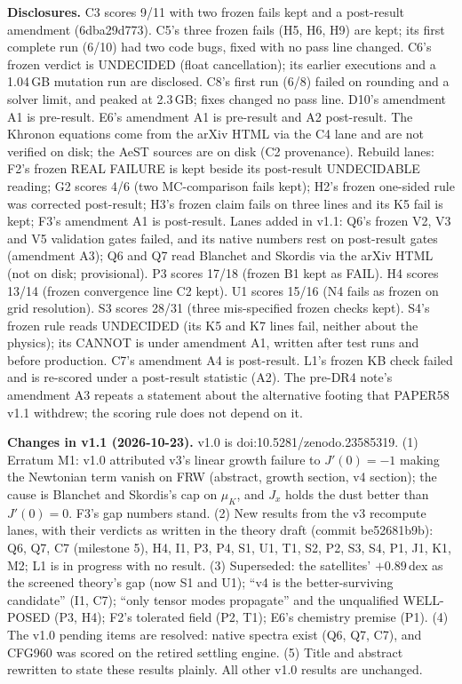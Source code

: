 \documentclass[10pt]{article}
\begin{document}
\textbf{Disclosures.} C3 scores 9/11 with two frozen fails kept and a post-result amendment (6dba29d773). C5's three frozen fails (H5, H6, H9) are kept; its first complete run (6/10) had two code bugs, fixed with no pass line changed. C6's frozen verdict is UNDECIDED (float cancellation); its earlier executions and a 1.04\,GB mutation run are disclosed. C8's first run (6/8) failed on rounding and a solver limit, and peaked at 2.3\,GB; fixes changed no pass line. D10's amendment A1 is pre-result. E6's amendment A1 is pre-result and A2 post-result. The Khronon equations come from the arXiv HTML via the C4 lane and are not verified on disk; the AeST sources are on disk (C2 provenance). Rebuild lanes: F2's frozen REAL FAILURE is kept beside its post-result UNDECIDABLE reading; G2 scores 4/6 (two MC-comparison fails kept); H2's frozen one-sided rule was corrected post-result; H3's frozen claim fails on three lines and its K5 fail is kept; F3's amendment A1 is post-result. Lanes added in v1.1: Q6's frozen V2, V3 and V5 validation gates failed, and its native numbers rest on post-result gates (amendment A3); Q6 and Q7 read Blanchet and Skordis via the arXiv HTML (not on disk; provisional). P3 scores 17/18 (frozen B1 kept as FAIL). H4 scores 13/14 (frozen convergence line C2 kept). U1 scores 15/16 (N4 fails as frozen on grid resolution). S3 scores 28/31 (three mis-specified frozen checks kept). S4's frozen rule reads UNDECIDED (its K5 and K7 lines fail, neither about the physics); its CANNOT is under amendment A1, written after test runs and before production. C7's amendment A4 is post-result. L1's frozen KB check failed and is re-scored under a post-result statistic (A2). The pre-DR4 note's amendment A3 repeats a statement about the alternative footing that PAPER58 v1.1 withdrew; the scoring rule does not depend on it.

\textbf{Changes in v1.1 (2026-10-23).} v1.0 is doi:10.5281/zenodo.23585319. (1) Erratum M1: v1.0 attributed v3's linear growth failure to $J'(0)=-1$ making the Newtonian term vanish on FRW (abstract, growth section, v4 section); the cause is Blanchet and Skordis's cap on $\mu_K$, and $J_x$ holds the dust better than $J'(0)=0$. F3's gap numbers stand. (2) New results from the v3 recompute lanes, with their verdicts as written in the theory draft (commit be52681b9b): Q6, Q7, C7 (milestone 5), H4, I1, P3, P4, S1, U1, T1, S2, P2, S3, S4, P1, J1, K1, M2; L1 is in progress with no result. (3) Superseded: the satellites' $+0.89$\,dex as the screened theory's gap (now S1 and U1); ``v4 is the better-surviving candidate'' (I1, C7); ``only tensor modes propagate'' and the unqualified WELL-POSED (P3, H4); F2's tolerated field (P2, T1); E6's chemistry premise (P1). (4) The v1.0 pending items are resolved: native spectra exist (Q6, Q7, C7), and CFG960 was scored on the retired settling engine. (5) Title and abstract rewritten to state these results plainly. All other v1.0 results are unchanged.
\end{document}
